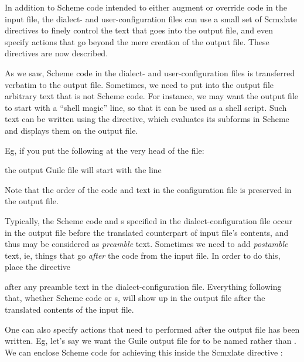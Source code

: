 In addition to Scheme code intended to either augment
or override code in the input file, the
dialect- and user-configuration files can
use a small set of Scmxlate directives to finely control
the text that goes into the output file, and even
specify actions that go beyond the mere creation
of the output file.  These directives are now described.


As we saw, Scheme code in the dialect- and
user-configuration files is transferred verbatim
to the output file.  Sometimes, we need to put into the
output file arbitrary text that is not Scheme code.
For instance, we may want the output file to start with
a ``shell magic'' line, so that it can be used as a
shell script.  Such text can be written using the
 directive, which evaluates its
subforms in Scheme and displays them on the output
file.

Eg, if you put the following at
the very head of the  file:


\n the output Guile file  will start with the
line


Note that the order of the code and 
text in the configuration file is preserved in
the output file.


Typically, the Scheme code and s
specified in the dialect-configuration file occur in
the output file before the translated counterpart of
input file's contents, and thus may be considered as
{\em preamble} text.   Sometimes we need to add {\em
postamble} text, ie, things that go {\em after} the
code from the input file.  In order to do this,
place the directive


\n after any preamble text in the dialect-configuration
file.  Everything following that, whether Scheme
code or s, will show up in the
output file after the translated contents of the input
file.


One can also specify actions that need to performed
after the output file has been written.  Eg, let's say
we want the Guile output file for  to be
named  rather than .  We can
enclose Scheme code for achieving this inside the
Scmxlate directive :

